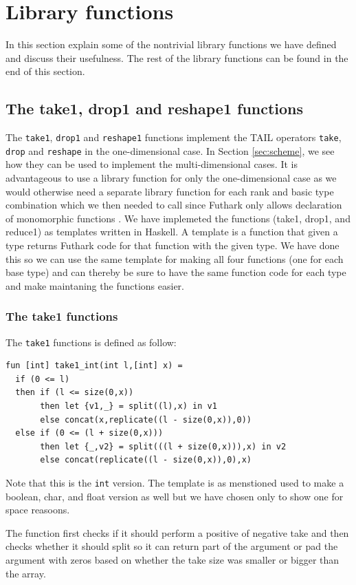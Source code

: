 \documentclass[11pt]{article}
\begin{document}
\section{Library functions}
\label{sec:library}
In this section explain some of the nontrivial library functions we have defined and discuss their usefulness. The rest of the  library functions can be found in the end of this section. 

\subsection{The take1, drop1 and reshape1 functions}
The {\tt take1}, {\tt drop1} and {\tt reshape1} functions implement the TAIL operators {\tt take}, {\tt drop} and {\tt reshape} in the one-dimensional case. In Section \ref{sec:scheme}, we see how they can be used to implement the multi-dimensional cases. It is advantageous to use a library function for only the one-dimensional case as we would otherwise need a separate library function for each 
rank and basic type combination which we then needed to call since Futhark only allows declaration of monomorphic functions \cite{TroelsHenriksen}.
We have implemeted the functions (take1, drop1, and reduce1) as templates written in Haskell. 
A template is a function that given a type returns Futhark code for that function with the given type.
We have done this so we can use the same template for making all four functions (one for each base type) and can thereby be sure to have the same function code for each type and make maintaning the functions easier. 

\subsubsection{The take1 functions}
The {\tt take1} functions is defined as follow: 
\begin{lstlisting}[language=Futhark]
fun [int] take1_int(int l,[int] x) =
  if (0 <= l)
  then if (l <= size(0,x))
       then let {v1,_} = split((l),x) in v1
       else concat(x,replicate((l - size(0,x)),0))
  else if (0 <= (l + size(0,x)))
       then let {_,v2} = split(((l + size(0,x))),x) in v2
       else concat(replicate((l - size(0,x)),0),x)
\end{lstlisting}
Note that this is the {\tt int} version. The template is as menstioned used to make a boolean, char, and float version as well but we have chosen only to show one for space reasoons. 

The function first checks if it should perform a positive of negative take and then checks whether it should split so it can return
part of the argument or pad the argument with zeros based on whether the take size was smaller or bigger than the array.
\end{document}

